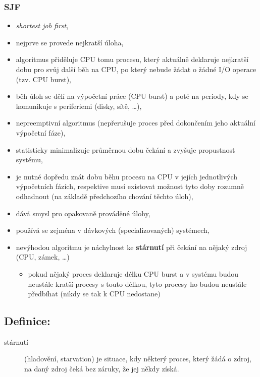 \documentclass[a4paper, 11pt]{article}
\begin{document}
\subsubsection{SJF}
\begin{itemize}
    \item \emph{shortest job first},
    \item nejprve se provede nejkratší úloha,
    \item algoritmus přiděluje CPU tomu procesu, který aktuálně deklaruje nejkratší dobu pro svůj další běh na CPU, po který nebude žádat o žádné I/O operace (tzv. CPU burst),
    \item běh úloh se dělí na výpočetní práce (CPU burst) a poté na periody, kdy se komunikuje s periferiemi (disky, sítě, \ldots),
    \item nepreemptivní algoritmus (nepřerušuje proces před dokončením jeho aktuální výpočetní fáze),
    \item statisticky minimalizuje průměrnou dobu čekání a zvyšuje propustnost systému,
    \item je nutné dopředu znát dobu běhu procesu na CPU v jejích jednotlivých výpočetních fázích, respektive musí existovat možnost tyto doby rozumně odhadnout (na základě předchozího chování těchto úloh),
    \item dává smysl pro opakovaně prováděné úlohy, 
    \item používá se zejména v dávkových (specializovaných) systémech,
    \item nevýhodou algoritmu je náchylnost ke \textbf{stárnutí} při čekání na nějaký zdroj (CPU, zámek, \ldots)
    \begin{itemize}
        \item pokud nějaký proces deklaruje délku CPU burst a v systému budou neustále kratší procesy s touto délkou, tyto procesy ho budou neustále předbíhat (nikdy se tak k CPU nedostane)    
    \end{itemize}
\end{itemize}

\subsection*{Definice:}
\begin{description}
\item[stárnutí] (hladovění, starvation) je situace, kdy některý proces, který žádá o zdroj, na daný zdroj čeká bez záruky, že jej někdy získá.
\end{description}
 
\end{document}
